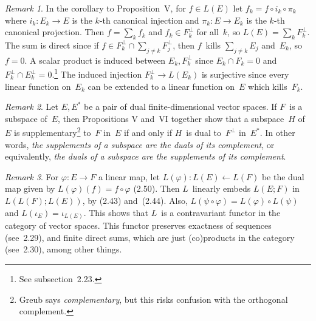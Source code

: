 \documentclass[letterpaper,12pt]{article}
\newcommand{\from}{\leftarrow}
\newcommand{\sect}{\cap}
\newcommand{\after}{\circ}
\newcommand{\oc}[1]{#1^{\perp}}
\theoremstyle{definition}
\theoremstyle{remark}
\newtheorem*{rmk}{Remark}
\begin{document}
\begin{rmk}
In the corollary to Proposition~V, for \(f\in L(E)\) let \(f_k=f\after i_k\after \pi_k\) where \(i_k:E_k\to E\) is the \(k\)-th canonical injection and \(\pi_k:E\to E_k\) is the \(k\)-th canonical projection. Then \(f=\sum_k f_k\) and \(f_k\in\oc{F_k}\) for all~\(k\), so \(L(E)=\sum_k\oc{F_k}\). The sum is direct since if \(f\in\oc{F_k}\sect\sum_{j\ne k}\oc{F_j}\), then \(f\)~kills \(\sum_{j\ne k}E_j\) and~\(E_k\), so \(f=0\). A scalar product is induced between \(E_k,\oc{F_k}\) since \(E_k\sect F_k=0\) and \(\oc{F_k}\sect\oc{E_k}=0\).\footnote{See subsection~2.23.} The induced injection \(\oc{F_k}\to L(E_k)\) is surjective since every linear function on~\(E_k\) can be extended to a linear function on~\(E\) which kills~\(F_k\).
\end{rmk}

\begin{rmk}
Let \(E,E^*\) be a pair of dual finite-dimensional vector spaces. If \(F\)~is a subspace of~\(E\), then Propositions V and~VI together show that a subspace~\(H\) of~\(E\) is supplementary\footnote{Greub says \emph{complementary}, but this risks confusion with the orthogonal complement.} to~\(F\) in~\(E\) if and only if \(H\)~is dual to~\(\oc{F}\) in~\(E^*\). In other words, \emph{the supplements of a subspace are the duals of its complement}, or equivalently, \emph{the duals of a subspace are the supplements of its complement}.
\end{rmk}

\begin{rmk}
For \(\varphi:E\to F\) a linear map, let \(L(\varphi):L(E)\from L(F)\) be the dual map given by \(L(\varphi)(f)=f\after\varphi\) (2.50). Then \(L\)~linearly embeds \(L(E;F)\) in \(L(L(F);L(E))\), by (2.43) and~(2.44). Also, \(L(\psi\after\varphi)=L(\varphi)\after L(\psi)\) and \(L(\iota_{E})=\iota_{L(E)}\). This shows that \(L\)~is a contravariant functor in the category of vector spaces. This functor preserves exactness of sequences (see~2.29), and finite direct sums, which are just (co)products in the category (see~2.30), among other things.
\end{rmk}
\end{document}
